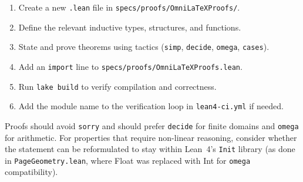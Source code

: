\begin{enumerate}
  \item Create a new \texttt{.lean} file in
        \texttt{specs/proofs/OmniLaTeXProofs/}.
  \item Define the relevant inductive types, structures, and functions.
  \item State and prove theorems using tactics (\texttt{simp},
        \texttt{decide}, \texttt{omega}, \texttt{cases}).
  \item Add an \texttt{import} line to
        \texttt{specs/proofs/OmniLaTeXProofs.lean}.
  \item Run \texttt{lake build} to verify compilation and correctness.
  \item Add the module name to the verification loop in
        \texttt{lean4-ci.yml} if needed.
\end{enumerate}

Proofs should avoid \texttt{sorry} and should prefer \texttt{decide} for
finite domains and \texttt{omega} for arithmetic.  For properties that
require non-linear reasoning, consider whether the statement can be
reformulated to stay within Lean~4's \texttt{Init} library (as done in
\texttt{PageGeometry.lean}, where Float was replaced with Int for
\texttt{omega} compatibility).

